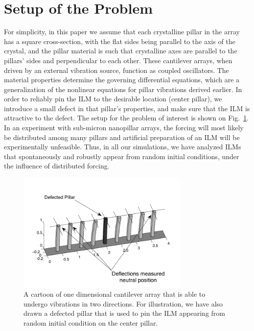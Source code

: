\documentclass[12pt]{report}
\begin{document}
\section{Setup of the Problem} 
For simplicity, in this paper we assume that each crystalline pillar in the array has a square cross-section, with the flat sides being parallel to the axis of the crystal, and the pillar material is such that crystalline axes are parallel to the pillars' sides and perpendicular to each other. 
These cantilever arrays, when driven by an external vibration source, function as coupled oscillators.  The material properties determine the governing differential equations, which are a generalization of the nonlinear equations for pillar vibrations derived earlier.  In order to reliably pin the ILM to the desirable location (center pillar), we introduce a small defect in that pillar's properties, and make sure that the ILM is attractive to the defect.  The setup for the problem of interest is shown on Fig.~\ref{fig:setup}.  In an experiment with sub-micron nanopillar arrays, the forcing will most likely be distributed among many pillars and artificial preparation of an ILM will be experimentally unfeasible. Thus,  in all our simulations, we have analyzed ILMs that spontaneously and robustly appear from random initial conditions, under the influence of distributed forcing.  
\begin{figure}[t]
\begin{center}
\includegraphics[width = 85mm]{../diagrams/pillarpicture.pdf}
\caption{A cartoon of one dimensional cantilever array that is able to undergo vibrations in two directions. For illustration, we have also drawn a defected pillar that is used to pin the ILM appearing from random initial condition on the center pillar. }
\label{fig:setup}
\end{center}
\end{figure}
\end{document}
